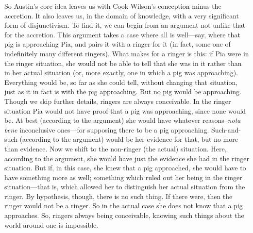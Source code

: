So Austin's core idea leaves us with Cook Wilson's conception minus the accretion. It also leaves us, in the domain of knowledge, with a very significant form of disjunctivism. To find it, we can begin from an argument not unlike that for the accretion. This argument takes a case where all is well---say, where that pig is approaching Pia, and pairs it with a ringer for it (in fact, some one of indefinitely many different ringers). What makes for a ringer is this: if Pia were in the ringer situation, she would not be able to tell that she was in it rather than in her actual situation (or, more exactly, one in which a pig was approaching). Everything would be, so far as she could tell, without changing that situation, just as it in fact is with the pig approaching. But no pig would be approaching. Though we skip further details, ringers are always conceivable. In the ringer situation Pia would not have proof that a pig was approaching, since none would be. At best (according to the argument) she would have whatever reasons--\emph{nota bene} inconclusive ones---for supposing there to be a pig approaching. Such-and-such (according to the argument) would be her evidence for that, but no more than evidence. Now we shift to the non-ringer (the actual) situation. Here, according to the argument, she would have just the evidence she had in the ringer situation. But if, in this case, she knew that a pig approached, she would have to have something more as well; something which ruled out her being in the ringer situation---that is, which allowed her to distinguish her actual situation from the ringer. By hypothesis, though, there is no such thing. If there were, then the ringer would not be a ringer. So in the actual case she does not know that a pig approaches. So, ringers always being conceivable, knowing such things about the world around one is impossible.

